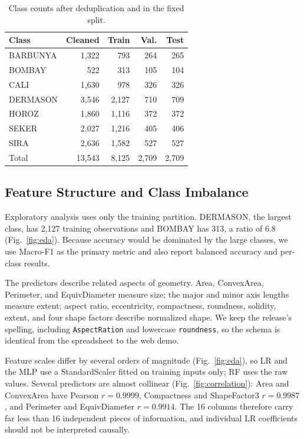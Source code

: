 \documentclass[conference,letterpaper]{IEEEtran}
\newcommand{\code}[1]{\texttt{#1}}
\begin{document}
\begin{table}[t]
\caption{Class counts after deduplication and in the fixed split.}
\label{tab:classcounts}
\centering\small
\begin{tabular}{lrrrr}
\toprule
Class & Cleaned & Train & Val. & Test\\
\midrule
BARBUNYA & 1,322 & 793 & 264 & 265\\
BOMBAY & 522 & 313 & 105 & 104\\
CALI & 1,630 & 978 & 326 & 326\\
DERMASON & 3,546 & 2,127 & 710 & 709\\
HOROZ & 1,860 & 1,116 & 372 & 372\\
SEKER & 2,027 & 1,216 & 405 & 406\\
SIRA & 2,636 & 1,582 & 527 & 527\\
\midrule
Total & 13,543 & 8,125 & 2,709 & 2,709\\
\bottomrule
\end{tabular}
\end{table}

\subsection{Feature Structure and Class Imbalance}
Exploratory analysis uses only the training partition. DERMASON, the largest class, has 2,127 training observations and BOMBAY has 313, a ratio of 6.8 (Fig.~\ref{fig:eda}). Because accuracy would be dominated by the large classes, we use Macro-F1 as the primary metric and also report balanced accuracy and per-class results.

The predictors describe related aspects of geometry. Area, ConvexArea, Perimeter, and EquivDiameter measure size; the major and minor axis lengths measure extent; aspect ratio, eccentricity, compactness, roundness, solidity, extent, and four shape factors describe normalized shape. We keep the release's spelling, including \code{AspectRation} and lowercase \code{roundness}, so the schema is identical from the spreadsheet to the web demo.

Feature scales differ by several orders of magnitude (Fig.~\ref{fig:eda}), so LR and the MLP use a StandardScaler fitted on training inputs only; RF uses the raw values. Several predictors are almost collinear (Fig.~\ref{fig:correlation}): Area and ConvexArea have Pearson $r=0.9999$, Compactness and ShapeFactor3 $r=0.9987$, and Perimeter and EquivDiameter $r=0.9914$. The 16 columns therefore carry far less than 16 independent pieces of information, and individual LR coefficients should not be interpreted causally.
\end{document}

